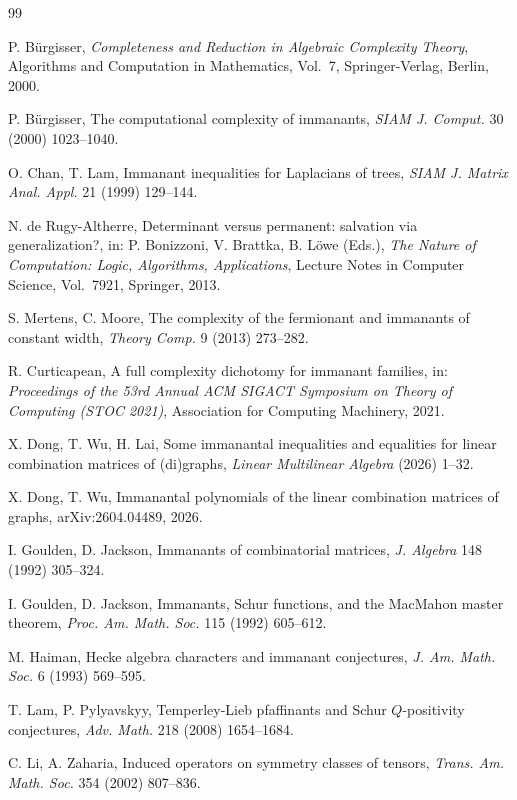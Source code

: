 \documentclass[11pt,a4paper]{article}
\begin{document}
\begin{thebibliography}{99}

P. B\"urgisser, \emph{Completeness and Reduction in Algebraic Complexity Theory}, Algorithms and Computation in Mathematics, Vol.~7, Springer-Verlag, Berlin, 2000.

P. B\"urgisser, The computational complexity of immanants, \emph{SIAM J. Comput.} 30 (2000) 1023--1040.


 O. Chan, T. Lam, Immanant inequalities for Laplacians of trees, \textit{SIAM J. Matrix Anal. Appl.} 21 (1999) 129--144.

N. de Rugy-Altherre, Determinant versus permanent: salvation via generalization?, in: P. Bonizzoni, V. Brattka, B. L\"owe (Eds.), \emph{The Nature of Computation: Logic, Algorithms, Applications}, Lecture Notes in Computer Science, Vol.~7921, Springer, 2013.


S. Mertens, C. Moore, The complexity of the fermionant and immanants of constant width, \emph{Theory Comp.} 9 (2013) 273--282.


R. Curticapean, A full complexity dichotomy for immanant families, in: \emph{Proceedings of the 53rd Annual ACM SIGACT Symposium on Theory of Computing (STOC 2021)}, Association for Computing Machinery, 2021.

    
 X. Dong, T. Wu, H. Lai, Some immanantal inequalities and equalities for linear combination matrices of (di)graphs, \textit{Linear Multilinear Algebra} (2026) 1--32.


 X. Dong, T. Wu, Immanantal polynomials of the linear combination matrices of graphs, arXiv:2604.04489, 2026.


I. Goulden, D. Jackson, Immanants of combinatorial matrices, \textit{J. Algebra} 148 (1992) 305--324.

I. Goulden, D. Jackson,   Immanants, Schur functions, and the MacMahon master theorem, \textit{Proc. Am. Math. Soc.} 115 (1992) 605--612.

M. Haiman, Hecke algebra characters and immanant conjectures, \textit{J. Am. Math. Soc.} 6 (1993) 569--595.

T. Lam, P. Pylyavskyy, Temperley-Lieb pfaffinants and Schur $Q$-positivity conjectures, \textit{Adv.  Math.} 218 (2008) 1654--1684.

C. Li, A. Zaharia, Induced operators on symmetry classes of tensors, \textit{Trans. Am. Math. Soc.}  354 (2002) 807--836.


\end{thebibliography}
\end{document}
